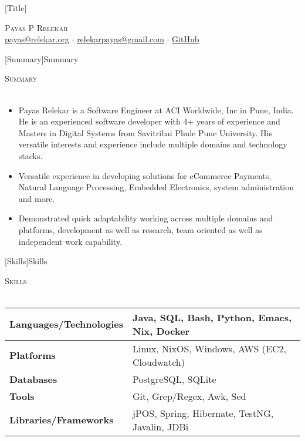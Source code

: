 \documentclass[a4paper]{article}
\newcommand{\lineunder} {
    \vspace*{-8pt} \\
    \hspace*{-18pt} \hrulefill \\
}
\newcommand{\header} [1] {
    {\hspace*{-18pt}\vspace*{6pt} \textsc{#1}}
    \vspace*{-6pt} \lineunder
}
\begin{document}
\vspace*{-40pt}

\vspace*{-10pt}
[Title]{}
\begin{center}
  {\Huge \scshape {Payas P Relekar}}\\
  \href{mailto:payas@relekar.org}{payas@relekar.org} $\cdot$ \href{mailto:relekarpayas@gmail.com}{relekarpayas@gmail.com} $\cdot$ \href{https://github.com/bhankas/}{GitHub}\\
\end{center}

[Summary]{Summary}
\header{Summary}
\vspace{1mm}

\begin{itemize} \itemsep 1pt
  \item Payas Relekar is a Software Engineer at ACI Worldwide, Inc in Pune, India. He is an experienced software developer with 4+ years of experience and Masters in Digital Systems from Savitribai Phule Pune University. His versatile interests and experience include multiple domains and technology stacks.
  \item Versatile experience in developing solutions for eCommerce Payments, Natural Language Processing, Embedded Electronics, system administration and more.
  \item Demonstrated quick adaptability working across multiple domains and platforms, development as well as research, team oriented as well as independent work capability.
\end{itemize}

[Skills]{Skills}
\header{Skills}
\vspace{1mm}
\bgroup
\setlength{\arrayrulewidth}{0.2mm}
\def\arraystretch{1.2}
\begin{tabularx}{\textwidth}{ | X | X | }
  \hline
  \textbf{Languages/Technologies} & Java, SQL, Bash, Python, Emacs, Nix, Docker        \\
  \hline
  \textbf{Platforms}             & Linux, NixOS, Windows, AWS (EC2, Cloudwatch)          \\
  \hline
  \textbf{Databases}             & PostgreSQL, SQLite          \\
  \hline
  \textbf{Tools}                 & Git, Grep/Regex, Awk, Sed            \\
  \hline
  \textbf{Libraries/Frameworks}  & jPOS, Spring, Hibernate, TestNG, Javalin, JDBi \\
  \hline
\end{tabularx}
\egroup
\vspace{2mm}
\end{document}
